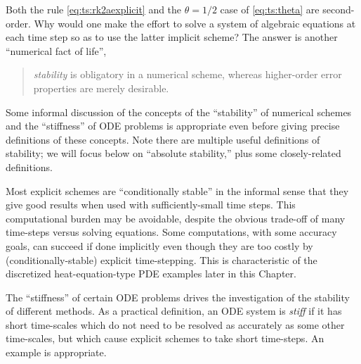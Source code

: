 Both the \RKtwoa rule \eqref{eq:ts:rk2aexplicit} and the $\theta=1/2$ case of \eqref{eq:ts:theta} are second-order.  Why would one make the effort to solve a system of algebraic equations at each time step so as to use the latter implicit scheme?  The answer is another ``numerical fact of life'',
\begin{quote}
\emph{stability} is obligatory in a numerical scheme, whereas higher-order error properties are merely desirable.
\end{quote}

Some informal discussion of the concepts of the ``stability'' of numerical schemes and the ``stiffness'' of ODE problems is appropriate even before giving precise definitions of these concepts.  Note there are multiple useful definitions of stability; we will focus below on ``absolute stability,'' plus some closely-related definitions.

Most explicit schemes are ``conditionally stable'' in the informal sense that they give good results when used with sufficiently-small time steps.  This computational burden may be avoidable, despite the obvious trade-off of many time-steps versus solving equations.  Some computations, with some accuracy goals, can succeed if done implicitly even though they are too costly by (conditionally-stable) explicit time-stepping.  This is characteristic of the discretized heat-equation-type PDE examples later in this Chapter.

The ``stiffness'' of certain ODE problems drives the investigation of the stability of different methods.  As a practical definition, an ODE system is \emph{stiff} if it has short time-scales which do not need to be resolved as accurately as some other time-scales, but which cause explicit schemes to take short time-steps.  An example is appropriate.

